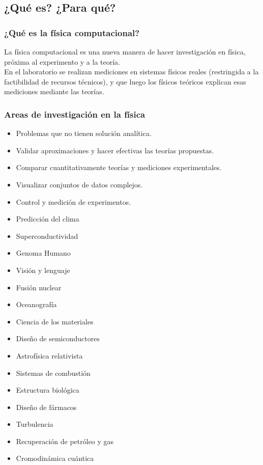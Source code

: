 \subsection{¿Qué es? ¿Para qué?}
\begin{frame}
\frametitle{¿Qué es la física computacional?}
La física computacional es una nueva manera de hacer investigación en física, próxima al
experimento y a la teoría.
\\
\medskip
En el laboratorio se realizan mediciones en sistemas físicos reales (restringida a la factibilidad de recursos técnicos), y que luego los físicos teóricos explican esas mediciones mediante las teorías.
\end{frame}
\begin{frame}
\frametitle{Areas de investigación en la física}
\begin{itemize}[<+->]
	\item Problemas que no tienen solución analítica.
	\item Validar aproximaciones y hacer efectivas las teorías propuestas.
	\item Comparar cuantitativamente teorías y mediciones experimentales.
	\item Visualizar conjuntos de datos complejos.
	\item Control y medición de experimentos.
\end{itemize}
\end{frame}
\begin{frame}
\fontsize{14}{14}\selectfont
\begin{multicols}{2}
\begin{itemize}[<+->]
	\item Predicción del clima
	\item Superconductividad
	\item Genoma Humano
	\item Visión y lenguaje
	\item Fusión nuclear
	\item Oceanografía
	\item Ciencia de los materiales
	\item Diseño de semiconductores
	\item Astrofísica relativista
	\item Sistemas de combustión
	\item Estructura biológica
	\item Diseño de fármacos
	\item Turbulencia
	\item Recuperación de petróleo y gas
	\item Cromodinámica cuántica
\end{itemize}
\end{multicols}
\end{frame}
